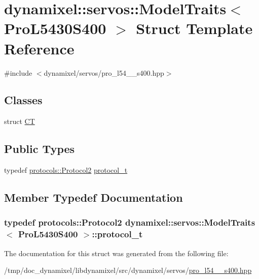 \hypertarget{structdynamixel_1_1servos_1_1_model_traits_3_01_pro_l5430_s400_01_4}{}\section{dynamixel\+:\+:servos\+:\+:Model\+Traits$<$ Pro\+L5430\+S400 $>$ Struct Template Reference}
\label{structdynamixel_1_1servos_1_1_model_traits_3_01_pro_l5430_s400_01_4}


{\ttfamily \#include $<$dynamixel/servos/pro\+\_\+l54\+\_\+\_\+s400.\+hpp$>$}

\subsection*{Classes}
\begin{DoxyCompactItemize}
\item 
struct \hyperlink{structdynamixel_1_1servos_1_1_model_traits_3_01_pro_l5430_s400_01_4_1_1_c_t}{CT}
\end{DoxyCompactItemize}
\subsection*{Public Types}
\begin{DoxyCompactItemize}
\item 
typedef \hyperlink{classdynamixel_1_1protocols_1_1_protocol2}{protocols\+::\+Protocol2} \hyperlink{structdynamixel_1_1servos_1_1_model_traits_3_01_pro_l5430_s400_01_4_aa3ec36bf4f2ad81a0482eb7c5d7fb1f6}{protocol\+\_\+t}
\end{DoxyCompactItemize}


\subsection{Member Typedef Documentation}
\subsubsection[{\texorpdfstring{protocol\+\_\+t}{protocol_t}}]{\setlength{\rightskip}{0pt plus 5cm}typedef {\bf protocols\+::\+Protocol2} {\bf dynamixel\+::servos\+::\+Model\+Traits}$<$ {\bf Pro\+L5430\+S400} $>$\+::{\bf protocol\+\_\+t}}\hypertarget{structdynamixel_1_1servos_1_1_model_traits_3_01_pro_l5430_s400_01_4_aa3ec36bf4f2ad81a0482eb7c5d7fb1f6}{}\label{structdynamixel_1_1servos_1_1_model_traits_3_01_pro_l5430_s400_01_4_aa3ec36bf4f2ad81a0482eb7c5d7fb1f6}


The documentation for this struct was generated from the following file\+:\begin{DoxyCompactItemize}
\item 
/tmp/doc\+\_\+dynamixel/libdynamixel/src/dynamixel/servos/\hyperlink{pro__l54__30__s400_8hpp}{pro\+\_\+l54\+\_\+\_\+s400.\+hpp}\end{DoxyCompactItemize}

